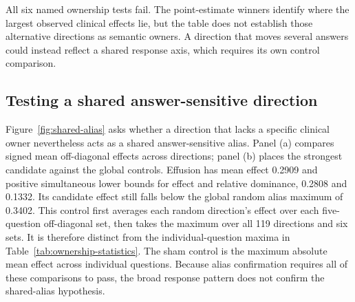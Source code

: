 \begin{table}[H]
\centering
\caption{Per-question ownership statistics.}
\label{tab:ownership-statistics}
\end{table}

All six named ownership tests fail. The point-estimate winners identify
where the largest observed clinical effects lie, but the table does not
establish those alternative directions as semantic owners. A direction
that moves several answers could instead reflect a shared response axis,
which requires its own control comparison.

\subsection{Testing a shared answer-sensitive direction}

Figure~\ref{fig:shared-alias} asks whether a direction that lacks a specific
clinical owner nevertheless acts as a shared answer-sensitive alias. Panel
(a) compares signed mean off-diagonal effects across directions; panel (b)
places the strongest candidate against the global controls.
Effusion has mean effect 0.2909 and positive simultaneous lower bounds for
effect and relative dominance, 0.2808 and 0.1332. Its candidate effect still
falls below the global random alias maximum of 0.3402. This control first
averages each random direction's effect over each five-question
off-diagonal set, then takes the maximum over all 119 directions and six
sets. It is therefore distinct from the individual-question maxima in
Table~\ref{tab:ownership-statistics}. The sham control is the maximum
absolute mean effect across individual questions. Because alias
confirmation requires all of these comparisons to pass, the broad response
pattern does not confirm the shared-alias hypothesis.

